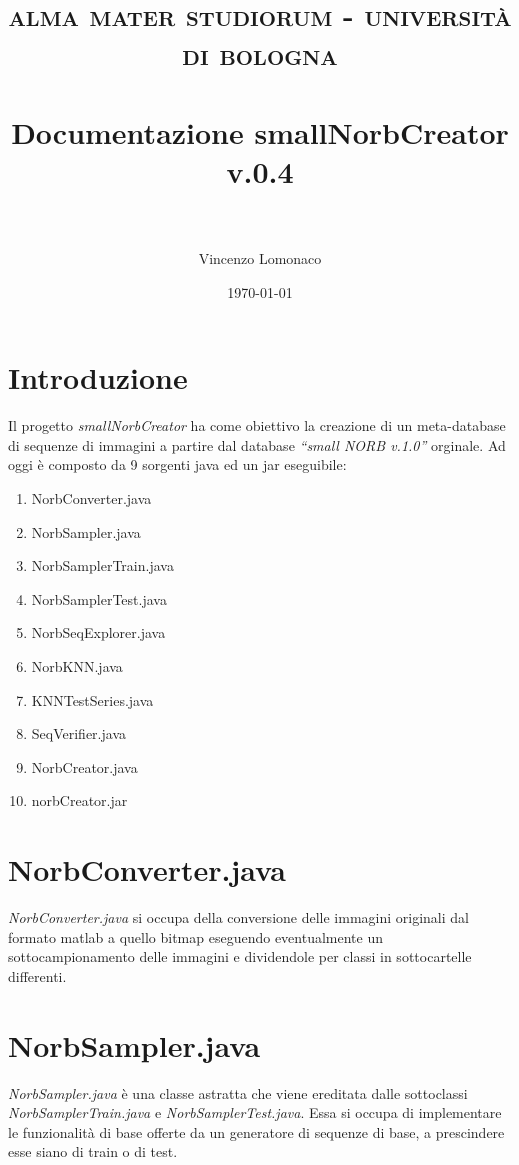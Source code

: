 \documentclass[paper=a4, fontsize=11pt]{scrartcl} %
\title{	
\normalfont \normalsize 
\textsc{alma mater studiorum - università di bologna} \\ [25pt] %
\horrule{0.5pt} \\[0.4cm] %
\huge Documentazione smallNorbCreator v.0.4 \\ %
\horrule{0.5pt} \\[0.5cm] %
}
\author{Vincenzo Lomonaco} %
\date{\normalsize\today} %
\numberwithin{equation}{section} %
\numberwithin{figure}{section} %
\numberwithin{table}{section} %
\begin{document}
\maketitle %


\section{Introduzione}

Il progetto \emph{smallNorbCreator} ha come obiettivo la creazione di un meta-database di sequenze di immagini a partire dal database \emph{``small NORB v.1.0''} orginale.
Ad oggi è composto da 9 sorgenti java ed un jar eseguibile:

\begin{enumerate}
	\item NorbConverter.java
	\item NorbSampler.java
	\item NorbSamplerTrain.java
	\item NorbSamplerTest.java 
	\item NorbSeqExplorer.java
	\item NorbKNN.java 
	\item KNNTestSeries.java 
	\item SeqVerifier.java
	\item NorbCreator.java
	\item norbCreator.jar
\end{enumerate}

\section{NorbConverter.java}
\emph{NorbConverter.java} si occupa della conversione delle immagini originali dal formato matlab a quello bitmap eseguendo eventualmente un sottocampionamento delle immagini e dividendole per classi in sottocartelle differenti.

\section{NorbSampler.java}
\emph{NorbSampler.java} è una classe astratta che viene ereditata dalle sottoclassi \emph{NorbSamplerTrain.java} e \emph{NorbSamplerTest.java}. Essa si occupa di implementare le funzionalità di base offerte da un generatore di sequenze di base, a prescindere esse siano di train o di test.
\end{document}
